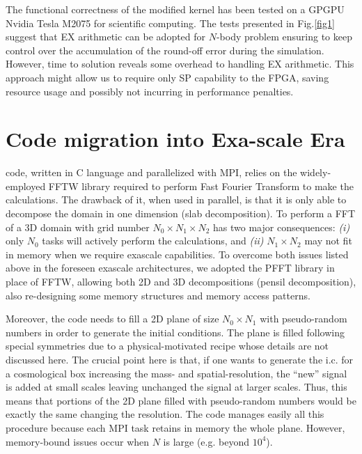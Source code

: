 \documentclass[11pt,twoside]{article}
\begin{document}
The functional correctness of the modified kernel has been tested on a GPGPU Nvidia Tesla M2075 for scientific computing.
The tests presented in Fig.\ref{fig1} suggest that EX arithmetic can be adopted for $N$-body problem ensuring 
to keep control over the accumulation of the round-off error during the simulation. However, time to solution 
reveals some overhead to handling EX arithmetic.
This approach might allow us to require only SP capability to the FPGA, saving resource usage and possibly 
not incurring in performance penalties.

\section{Code migration into Exa-scale Era}
{} code, written in C language and parallelized with MPI, relies on the widely-employed FFTW library \citep{FFTW} required
to perform Fast Fourier Transform to make the calculations. 
The drawback of it, when used in parallel, is that it is only able to decompose the domain in one
dimension (slab decomposition).
To perform a FFT of a 3D domain with grid number $N_{0} \times N_{1} \times N_{2}$ has two major consequences: \emph{(i)} only $N_{0}$ tasks will actively perform the calculations, 
and \emph{(ii)} $N_{1} \times N_{2}$ may not fit in memory when we require exascale capabilities.
To overcome both issues listed above in the foreseen exascale architectures, we adopted the PFFT library \citep{PFFT} in place of FFTW, 
allowing both 2D and 3D decompositions (pensil decomposition), also re-designing some memory structures and memory access patterns.

Moreover, the code needs to fill a 2D plane of size $N_{0} \times N_{1}$ with pseudo-random numbers
in order to generate the initial conditions. The plane is filled following special symmetries
due to a physical-motivated recipe whose details are not discussed here.
The crucial point here is that, if one wants to generate the i.c. for a cosmological
box increasing the mass- and spatial-resolution, the ``new'' signal is added at small scales
leaving unchanged the signal at larger scales. 
Thus, this means that portions of the 2D plane filled with pseudo-random numbers would be exactly the same changing the resolution.
The code manages easily all this procedure because each MPI task retains in memory the whole plane.
However, memory-bound issues occur when $N$ is large (e.g. beyond $10^{4}$).
\end{document}

